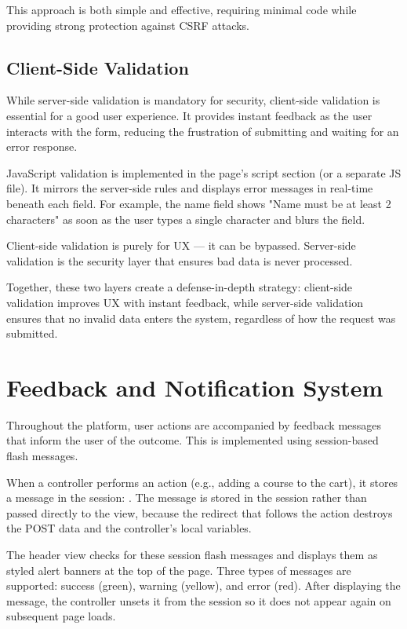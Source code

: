 \documentclass[12pt,a4paper]{report}
\begin{document}
This approach is both simple and effective, requiring minimal code while providing strong protection against CSRF attacks.

\subsection{Client-Side Validation}

While server-side validation is mandatory for security, client-side validation is essential for a good user experience. It provides instant feedback as the user interacts with the form, reducing the frustration of submitting and waiting for an error response.

JavaScript validation is implemented in the page's script section (or a separate JS file). It mirrors the server-side rules and displays error messages in real-time beneath each field. For example, the name field shows "Name must be at least 2 characters" as soon as the user types a single character and blurs the field.

Client-side validation is purely for UX — it can be bypassed. Server-side validation is the security layer that ensures bad data is never processed.

Together, these two layers create a defense-in-depth strategy: client-side validation improves UX with instant feedback, while server-side validation ensures that no invalid data enters the system, regardless of how the request was submitted.

\section{Feedback and Notification System}

Throughout the platform, user actions are accompanied by feedback messages that inform the user of the outcome. This is implemented using session-based flash messages.

When a controller performs an action (e.g., adding a course to the cart), it stores a message in the session: . The message is stored in the session rather than passed directly to the view, because the redirect that follows the action destroys the POST data and the controller's local variables.

The header view checks for these session flash messages and displays them as styled alert banners at the top of the page. Three types of messages are supported: success (green), warning (yellow), and error (red). After displaying the message, the controller unsets it from the session so it does not appear again on subsequent page loads.
\end{document}
